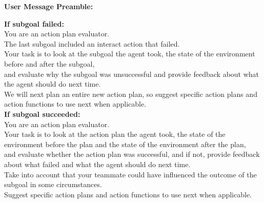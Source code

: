 \documentclass{article} %
\begin{document}
\vspace{10mm}
\begin{tcolorbox}[
    title={\small \textbf{Evaluate Action Outcomes/Self-Reflection}},
    width=\linewidth, %
    fontupper=\fontsize{9pt}{11pt}\selectfont\ttfamily,
    before skip=0pt,
    after skip=0pt
] %

\textbf{User Message Preamble:}

\textbf{If subgoal failed:}\\
You are an action plan evaluator.\\
The last subgoal included an interact action that failed.\\
Your task is to look at the subgoal the agent took, the state of the environment before and after the subgoal,\\
and evaluate why the subgoal was unsuccessful and provide feedback about what the agent should do next time.\\
We will next plan an entire new action plan, so suggest specific action plans and action functions to use next when applicable.\\

\textbf{If subgoal succeeded:}\\
You are an action plan evaluator.\\
Your task is to look at the action plan the agent took, the state of the environment before the plan and the state of the environment after the plan,\\
and evaluate whether the action plan was successful, and if not, provide feedback about what failed and what the agent should do next time.\\
Take into account that your teammate could have influenced the outcome of the subgoal in some circumstances.\\
Suggest specific action plans and action functions to use next when applicable.\\

\end{tcolorbox}
\vspace{10mm}
\end{document}
